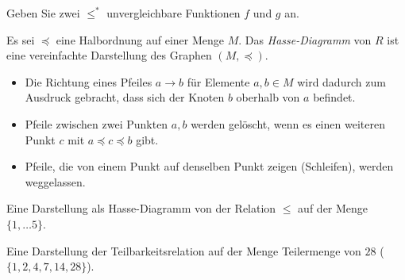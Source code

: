 \begin{ueb}
	Geben Sie zwei $\leq^*$ unvergleichbare Funktionen $f$ und $g$ an.
\end{ueb}
\begin{lsg}
\end{lsg}

\begin{df}
Es sei $\preceq$ eine Halbordnung auf einer Menge $M$. Das \textit{Hasse-Diagramm} von $R$ ist eine vereinfachte Darstellung des Graphen $(M,\preceq)$.
\begin{itemize}
\item Die Richtung eines Pfeiles $a\to b$ für Elemente $a,b\in M$ wird dadurch zum Ausdruck gebracht, dass sich der Knoten $b$ oberhalb von $a$ befindet.
\item Pfeile zwischen zwei Punkten $a,b$ werden gelöscht, wenn es einen weiteren Punkt $c$ mit $a\preceq c\preceq b$ gibt.
\item Pfeile, die von einem Punkt auf denselben Punkt zeigen (Schleifen), werden weggelassen.
\end{itemize}
\end{df}

\begin{bsp}
Eine Darstellung als Hasse-Diagramm von der Relation $\leq$ auf der Menge $\{1,\dots 5\}$.
\begin{center}
\end{center}
\end{bsp}

\begin{bsp}
Eine Darstellung der Teilbarkeitsrelation auf der Menge Teilermenge von $28$ ($\{1,2,4,7,14, 28 \}$).
\begin{center}
\end{center}
\end{bsp}

